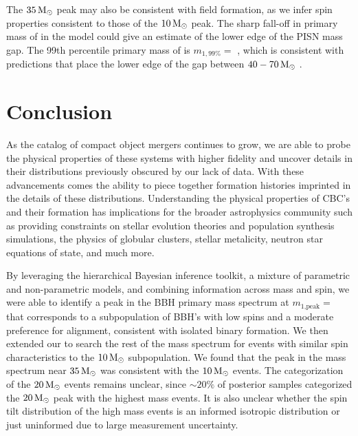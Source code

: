 The $35{\,\rm M}_\odot$ peak may also be consistent with field formation, as we infer spin properties consistent to those of the $10{\,\rm M}_\odot$ peak. The sharp fall-off in primary mass of \contA{} in the \comp{} model could give an estimate of the lower edge of the PISN mass gap. The 99th percentile primary mass of \contA{} is $m_{1,99\%} = $ \result{$\CIPlusMinus{\macros[Mass][Composite][ContinuumA][99percentile]}$ \msun}, which is consistent with predictions that place the lower edge of the gap between $40-70{\,\rm M}_\odot$ \citep{1901.00215,1910.12874v1,2103.07933v1,2104.07783v2}. 

\section{Conclusion} \label{sec:conclusion}


As the catalog of compact object mergers continues to grow, we are able to probe the physical properties of these systems with higher fidelity and uncover details in their distributions previously obscured by our lack of data. With these advancements comes the ability to piece together formation histories imprinted in the details of these distributions. Understanding the physical properties of CBC's and their formation has implications for the broader astrophysics community such as providing constraints on stellar evolution theories and population synthesis simulations, the physics of globular clusters, stellar metalicity, neutron star equations of state, and much more. 

By leveraging the hierarchical Bayesian inference toolkit, a mixture of parametric and non-parametric models, and combining information across mass and spin, we were able to identify a peak in the BBH primary mass spectrum at $m_\text{1,peak} = $ \result{$\CIPlusMinus{\macros[Mass][Base][PeakA][max]}$ \msun} that corresponds to a subpopulation of BBH's with low spins and a moderate preference for alignment, consistent with isolated binary formation. We then extended our \base{} to search the rest of the mass spectrum for events with similar spin characteristics to the $10{\,\rm M}_\odot$ subpopulation. We found that the peak in the mass spectrum near $35{\,\rm M}_\odot$ was consistent with the $10{\,\rm M}_\odot$ events. The categorization of the $20{\,\rm M}_\odot$ events remains unclear, since $\sim20\%$ of posterior samples categorized the $20{\,\rm M}_\odot$ peak with the highest mass events. It is also unclear whether the spin tilt distribution of the high mass events is an informed isotropic distribution or just uninformed due to large measurement uncertainty. 

